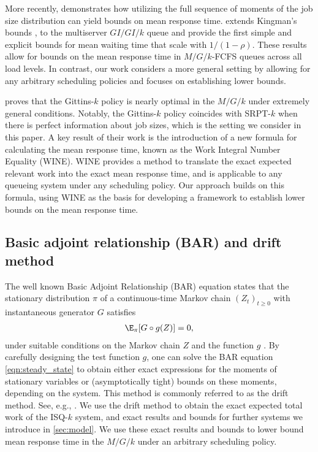 More recently, \cite{Gupta2011} demonstrates how utilizing the full sequence of moments of the job size distribution can yield 
bounds on mean response time. \cite{Li2024} extends Kingman’s bounds \citep{Kingman1962}, to the multiserver $GI/GI/k$ queue and provide the first simple and explicit bounds for mean waiting time that scale with $1/(1-\rho)$.  These results allow for bounds on the mean response time in $M/G/k$-FCFS queues across all load levels. In contrast, our work considers a more general setting by allowing for any arbitrary scheduling policies and focuses on establishing lower bounds.

\cite{Scully2020} proves that the Gittins-$k$ policy is nearly optimal in the $M/G/k$ under extremely general conditions. Notably, the Gittins-$k$ policy coincides with SRPT-$k$ when there is perfect information about job sizes, which is the setting we consider in this paper. A key result of their work is the introduction of a new formula for calculating the mean response time, known as the Work Integral Number Equality (WINE). WINE provides a method to translate the exact expected relevant work into the exact mean response time, and is applicable to any queueing system under any scheduling policy. Our approach builds on this formula, using WINE as the basis for developing a framework to establish lower bounds on the mean response time. 

\subsection{Basic adjoint relationship (BAR) and drift method}
\label{sub_sec:prior_bar}

The well known Basic Adjoint Relationship (BAR) equation states that the stationary distribution $\pi$ of a continuous-time Markov chain $(Z_t)_{t\geq 0}$ with instantaneous generator $G$ satisfies
\begin{align}
\label{eqn:steady_state}
    \E_{\pi}[G\circ g(Z)]=0,
\end{align}
under suitable conditions on the Markov chain $Z$ and the function $g$ \citep{Glynn2008}. By carefully designing the test function $g$, one can solve the BAR equation \eqref{eqn:steady_state} to obtain either exact expressions for the moments of stationary variables or (asymptotically tight) bounds on these moments, depending on the system. This method is commonly referred to as the drift method. See, e.g.,  \cite{Eryilmaz2012,Maguluri2016,Grosof2023TRaM,Hong2023}. We use the drift method to obtain the exact expected total work of the ISQ-$k$ system,
and exact results and bounds for further systems we introduce in \cref{sec:model}. We use these exact results and bounds to lower bound mean response time in the $M/G/k$ under an arbitrary scheduling policy.
